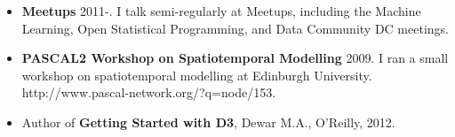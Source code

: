 \documentclass{res}
\begin{document}
\begin{resume}
\begin{itemize}
  \item {\bf Meetups} 2011-. I talk semi-regularly at Meetups, including the Machine Learning, Open Statistical Programming, and Data Community DC meetings.
  \item {\bf PASCAL2 Workshop on Spatiotemporal Modelling} 2009. I ran a small workshop on spatiotemporal modelling at Edinburgh University. http://www.pascal-network.org/?q=node/153.
  \item Author of {\bf Getting Started with D3}, Dewar M.A., O'Reilly, 2012.  
\end{itemize}

\end{resume}
\end{document}
